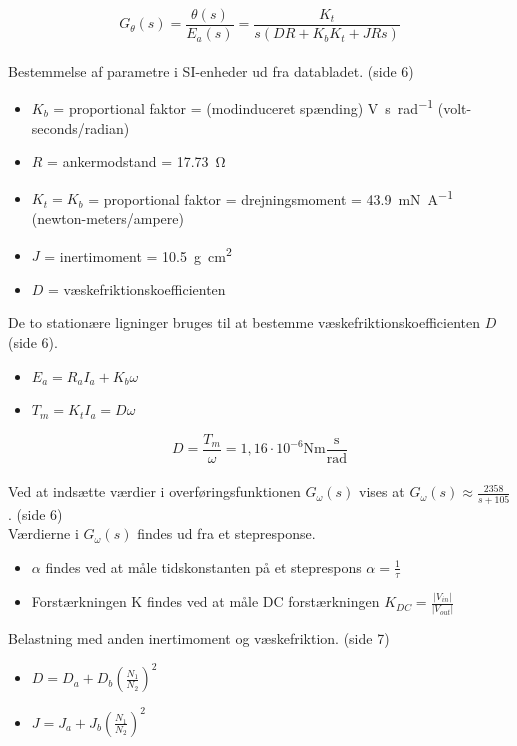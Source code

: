\documentclass[danish]{article}
\begin{document}
\begin{equation}
G_{\theta}(s) = \dfrac{\theta(s)}{E_a(s)} = \dfrac{K_t}{s(D R+K_b K_t+J R s)}
\end{equation}\\

Bestemmelse af parametre i SI-enheder ud fra databladet. (side 6)
\begin{itemize}
	\item $K_b$ = proportional faktor = (modinduceret spænding) \si{\volt\second\per\radian} (volt-seconds/radian)
	\item $R$ = ankermodstand = \SI{17,73}{\ohm}
	\item $K_t = K_b$ = proportional faktor =  drejningsmoment = \SI{43,9}{\milli\newton\per\ampere} (newton-meters/ampere)
	\item $J$ = inertimoment = \SI{10,5}{\gram\square\centi\meter}
	\item $D$ = væskefriktionskoefficienten
\end{itemize}

De to stationære ligninger bruges til at bestemme væskefriktionskoefficienten $D$ (side 6).
\begin{itemize}
	\item  $E_a = R_a I_a + K_b \omega$ 
	\item $T_m = K_t I_a = D \omega$ 	
\end{itemize}

\begin{equation}
D = \dfrac{T_m}{\omega} = 1,16\cdot 10^{-6} \si{\newton\meter}\frac{\si{\second}}{\si{\radian}}
\end{equation}\\

Ved at indsætte værdier i overføringsfunktionen $G_\omega(s)$ vises at $G_\omega(s) \approx \frac{2358}{s+105}$. (side 6)\\

Værdierne i $G_\omega(s)$ findes ud fra et stepresponse. 
\begin{itemize}
	\item $\alpha$ findes ved at måle tidskonstanten på et steprespons $\alpha = \frac{1}{\tau}$
	\item  Forstærkningen K findes ved at måle DC forstærkningen $K_{DC} = \frac{|V_{in}|}{|V_{out}|}$
\end{itemize}
\newpage
Belastning med anden inertimoment og væskefriktion. (side 7)
\begin{itemize}
	\item $D = D_a + D_b(\frac{N_1}{N_2})^2$
	\item $J = J_a + J_b(\frac{N_1}{N_2})^2$
\end{itemize}
\end{document}
